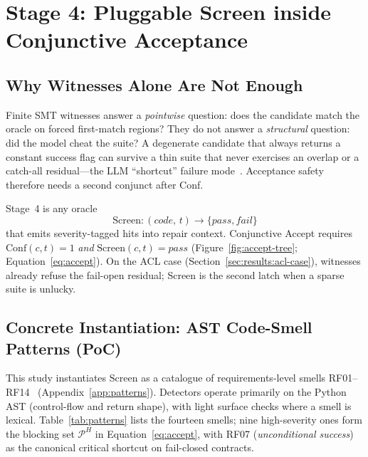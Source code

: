 \section{Stage 4: Pluggable Screen inside Conjunctive Acceptance}
\label{sec:method:screen}
\label{sec:method:guard}

\subsection{Why Witnesses Alone Are Not Enough}
\label{subsec:method:why-screen}

Finite SMT witnesses answer a \emph{pointwise} question: does the candidate
match the oracle on forced first-match regions?
They do not answer a \emph{structural} question: did the model cheat the suite?
A degenerate candidate that always returns a constant success flag can survive
a thin suite that never exercises an overlap or a catch-all residual---the LLM
``shortcut'' failure mode~\cite{dakhel2023copilot,hovemeyer2004findbugs}.
Acceptance safety therefore needs a second conjunct after Conf.

Stage~4 is any oracle
\begin{equation}
  \mathrm{Screen} : (\mathit{code},\, t) \longrightarrow
  \{\mathit{pass},\mathit{fail}\}
\end{equation}
that emits severity-tagged hits into repair context.
Conjunctive Accept requires
$\mathrm{Conf}(c,t){=}1$ \emph{and}
$\mathrm{Screen}(c,t){=}\mathit{pass}$
(Figure~\ref{fig:accept-tree}; Equation~\eqref{eq:accept}).
On the ACL case (Section~\ref{sec:results:acl-case}), witnesses already refuse
the fail-open residual; Screen is the second latch when a sparse suite is
unlucky.

\subsection{Concrete Instantiation: AST Code-Smell Patterns (PoC)}
\label{subsec:method:smell-poc}

This study instantiates $\mathrm{Screen}$ as a catalogue of
requirements-level smells RF01--RF14~\citep{li2023iet_faultprevention}
(Appendix~\ref{app:patterns}).
Detectors operate primarily on the Python AST (control-flow and return shape),
with light surface checks where a smell is lexical.
Table~\ref{tab:patterns} lists the fourteen smells; nine high-severity ones
form the blocking set $\mathcal{P}^H$ in Equation~\eqref{eq:accept}, with RF07
(\emph{unconditional success}) as the canonical critical shortcut on
fail-closed contracts.

